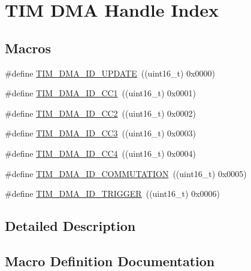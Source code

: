 \hypertarget{group___d_m_a___handle__index}{}\section{T\+IM D\+MA Handle Index}
\label{group___d_m_a___handle__index}
\subsection*{Macros}
\begin{DoxyCompactItemize}
\item 
\#define \mbox{\hyperlink{group___d_m_a___handle__index_ga15f38cee11f8b2b5a85cbf4552ba140d}{T\+I\+M\+\_\+\+D\+M\+A\+\_\+\+I\+D\+\_\+\+U\+P\+D\+A\+TE}}~((uint16\+\_\+t) 0x0000)
\item 
\#define \mbox{\hyperlink{group___d_m_a___handle__index_ga7ca691eb5e29b0206d3390cc6e90079a}{T\+I\+M\+\_\+\+D\+M\+A\+\_\+\+I\+D\+\_\+\+C\+C1}}~((uint16\+\_\+t) 0x0001)
\item 
\#define \mbox{\hyperlink{group___d_m_a___handle__index_ga9c52f32d4bd21dd2d232900219f0a111}{T\+I\+M\+\_\+\+D\+M\+A\+\_\+\+I\+D\+\_\+\+C\+C2}}~((uint16\+\_\+t) 0x0002)
\item 
\#define \mbox{\hyperlink{group___d_m_a___handle__index_ga6e8145f305b54744bf2ef379a4315a40}{T\+I\+M\+\_\+\+D\+M\+A\+\_\+\+I\+D\+\_\+\+C\+C3}}~((uint16\+\_\+t) 0x0003)
\item 
\#define \mbox{\hyperlink{group___d_m_a___handle__index_ga1860c00b370435ff40d9e65f14a61706}{T\+I\+M\+\_\+\+D\+M\+A\+\_\+\+I\+D\+\_\+\+C\+C4}}~((uint16\+\_\+t) 0x0004)
\item 
\#define \mbox{\hyperlink{group___d_m_a___handle__index_gaa707c98bb11277665635ca7aef1e4193}{T\+I\+M\+\_\+\+D\+M\+A\+\_\+\+I\+D\+\_\+\+C\+O\+M\+M\+U\+T\+A\+T\+I\+ON}}~((uint16\+\_\+t) 0x0005)
\item 
\#define \mbox{\hyperlink{group___d_m_a___handle__index_ga39900e5227e4d813a726a1df5d86671c}{T\+I\+M\+\_\+\+D\+M\+A\+\_\+\+I\+D\+\_\+\+T\+R\+I\+G\+G\+ER}}~((uint16\+\_\+t) 0x0006)
\end{DoxyCompactItemize}


\subsection{Detailed Description}


\subsection{Macro Definition Documentation}
\mbox{\label{group___d_m_a___handle__index_ga7ca691eb5e29b0206d3390cc6e90079a}} 
